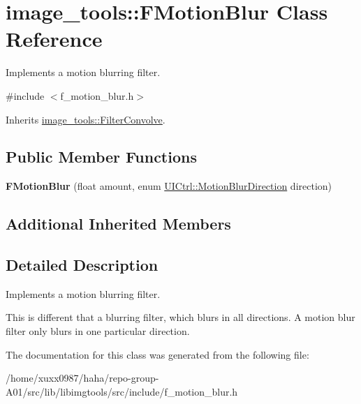 \hypertarget{classimage__tools_1_1FMotionBlur}{}\section{image\+\_\+tools\+:\+:F\+Motion\+Blur Class Reference}
\label{classimage__tools_1_1FMotionBlur}


Implements a motion blurring filter.  




{\ttfamily \#include $<$f\+\_\+motion\+\_\+blur.\+h$>$}



Inherits \hyperlink{classimage__tools_1_1FilterConvolve}{image\+\_\+tools\+::\+Filter\+Convolve}.

\subsection*{Public Member Functions}
\begin{DoxyCompactItemize}
\item 
{\bfseries F\+Motion\+Blur} (float amount, enum \hyperlink{classimage__tools_1_1UICtrl_a56d4f68bf91302769d7bc453d8d57cee}{U\+I\+Ctrl\+::\+Motion\+Blur\+Direction} direction)\hypertarget{classimage__tools_1_1FMotionBlur_a1cb472dcd0a7d2a26fb81fbeeccb78c1}{}\label{classimage__tools_1_1FMotionBlur_a1cb472dcd0a7d2a26fb81fbeeccb78c1}

\end{DoxyCompactItemize}
\subsection*{Additional Inherited Members}


\subsection{Detailed Description}
Implements a motion blurring filter. 

This is different that a blurring filter, which blurs in all directions. A motion blur filter only blurs in one particular direction. 

The documentation for this class was generated from the following file\+:\begin{DoxyCompactItemize}
\item 
/home/xuxx0987/haha/repo-\/group-\/\+A01/src/lib/libimgtools/src/include/f\+\_\+motion\+\_\+blur.\+h\end{DoxyCompactItemize}
